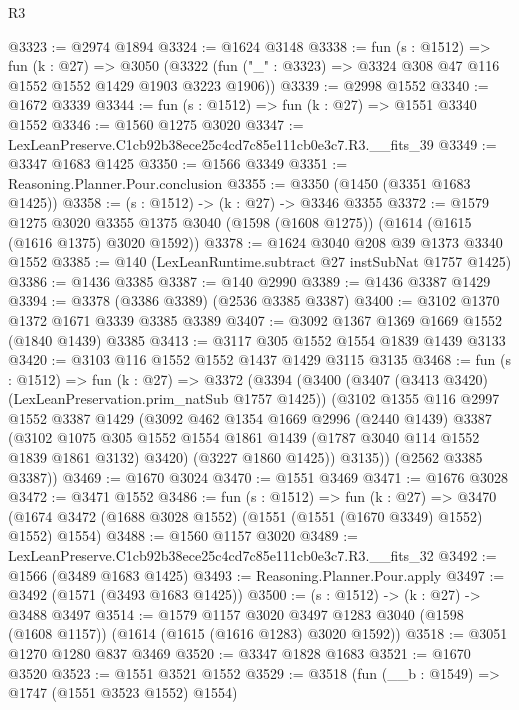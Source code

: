 \begin{lexlean}{R3}
\begin{coremodule}
@3323 := @2974 @1894
@3324 := @1624 @3148
@3338 := fun (s : @1512) =>
  fun (k : @27) =>
  @3050 (@3322 (fun ("_" : @3323) => @3324 @308 @47 @116 @1552 @1552 @1429 @1903 @3223 @1906))
@3339 := @2998 @1552
@3340 := @1672 @3339
@3344 := fun (s : @1512) => fun (k : @27) => @1551 @3340 @1552
@3346 := @1560 @1275 @3020
@3347 := LexLeanPreserve.C1cb92b38ece25c4cd7c85e111cb0e3c7.R3.__fits_39
@3349 := @3347 @1683 @1425
@3350 := @1566 @3349
@3351 := Reasoning.Planner.Pour.conclusion
@3355 := @3350 (@1450 (@3351 @1683 @1425))
@3358 := (s : @1512) -> (k : @27) -> @3346 @3355
@3372 := @1579
    @1275
    @3020
    @3355
    @1375
    @3040
    (@1598 (@1608 @1275))
    (@1614 (@1615 (@1616 @1375) @3020 @1592))
@3378 := @1624 @3040 @208 @39 @1373 @3340 @1552
@3385 := @140 (LexLeanRuntime.subtract @27 instSubNat @1757 @1425)
@3386 := @1436 @3385
@3387 := @140 @2990
@3389 := @1436 @3387 @1429
@3394 := @3378 (@3386 @3389) (@2536 @3385 @3387)
@3400 := @3102 @1370 @1372 @1671 @3339 @3385 @3389
@3407 := @3092 @1367 @1369 @1669 @1552 (@1840 @1439) @3385
@3413 := @3117 @305 @1552 @1554 @1839 @1439 @3133
@3420 := @3103 @116 @1552 @1552 @1437 @1429 @3115 @3135
@3468 := fun (s : @1512) =>
  fun (k : @27) =>
  @3372
    (@3394
      (@3400
        (@3407 (@3413 @3420) (LexLeanPreservation.prim_natSub @1757 @1425))
        (@3102
          @1355
          @116
          @2997
          @1552
          @3387
          @1429
          (@3092
            @462
            @1354
            @1669
            @2996
            (@2440 @1439)
            @3387
            (@3102
              @1075
              @305
              @1552
              @1554
              @1861
              @1439
              (@1787 @3040 @114 @1552 @1839 @1861 @3132)
              @3420)
            (@3227 @1860 @1425))
          @3135))
      (@2562 @3385 @3387))
@3469 := @1670 @3024
@3470 := @1551 @3469
@3471 := @1676 @3028
@3472 := @3471 @1552
@3486 := fun (s : @1512) =>
  fun (k : @27) =>
  @3470 (@1674 @3472 (@1688 @3028 @1552) (@1551 (@1551 (@1670 @3349) @1552) @1552) @1554)
@3488 := @1560 @1157 @3020
@3489 := LexLeanPreserve.C1cb92b38ece25c4cd7c85e111cb0e3c7.R3.__fits_32
@3492 := @1566 (@3489 @1683 @1425)
@3493 := Reasoning.Planner.Pour.apply
@3497 := @3492 (@1571 (@3493 @1683 @1425))
@3500 := (s : @1512) -> (k : @27) -> @3488 @3497
@3514 := @1579
    @1157
    @3020
    @3497
    @1283
    @3040
    (@1598 (@1608 @1157))
    (@1614 (@1615 (@1616 @1283) @3020 @1592))
@3518 := @3051 @1270 @1280 @837 @3469
@3520 := @3347 @1828 @1683
@3521 := @1670 @3520
@3523 := @1551 @3521 @1552
@3529 := @3518 (fun (__b : @1549) => @1747 (@1551 @3523 @1552) @1554)

\end{coremodule}
\end{lexlean}
